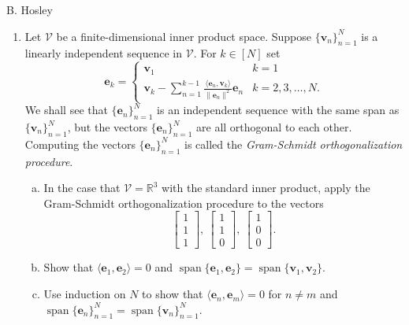 \documentclass[12pt]{amsart}
\newcommand{\1}{\mathbbm{1}}
\numberwithin{equation}{section}
\numberwithin{Theorem}{section}
\theoremstyle{plain} %
\theoremstyle{definition}
\theoremstyle{remark}
\begin{document}
\thispagestyle{empty}

\hspace{\fill} {\Large B. Hosley}
\bigskip \raggedbottom


\begin{enumerate}[1.]

\item Let \(\mathcal{V}\) be a finite-dimensional inner product space. Suppose \(\{\mathbf{v}_{n}\}_{n=1}^{N}\) is a linearly independent sequence in \(\mathcal{V}\).
For \(k\in[N]\) set
\[\mathbf{e}_{k} = \begin{cases} \mathbf{v}_{1} & k=1\\ \displaystyle{\mathbf{v}_{k} - \sum_{n=1}^{k-1}\frac{\langle \mathbf{e}_{n},\mathbf{v}_{k}\rangle}{\|\mathbf{e}_{n}\|^{2}} \mathbf{e}_{n}} & k=2,3,\ldots,N.\end{cases}\]
We shall see that \(\{\mathbf{e}_{n}\}_{n=1}^{N}\) is an independent sequence with the same span as \(\{\mathbf{v}_{n}\}_{n=1}^{N}\), but the vectors \(\{\mathbf{e}_{n}\}_{n=1}^{N}\) are all orthogonal to each other. Computing the vectors \(\{\mathbf{e}_{n}\}_{n=1}^{N}\) is called the \textit{Gram-Schmidt orthogonalization procedure}.\bigskip

\begin{enumerate}[(a)]

\item In the case that \(\mathcal{V} = \mathbb{R}^{3}\) with the standard inner product, apply the Gram-Schmidt orthogonalization procedure to the vectors 
\[\begin{bmatrix} 1\\1\\1\end{bmatrix},\ \begin{bmatrix} 1\\1\\0\end{bmatrix},\ \begin{bmatrix} 1\\0\\0\end{bmatrix}.\]
\bigskip

\item Show that \(\langle \mathbf{e}_{1},\mathbf{e}_{2}\rangle = 0\) and \(\operatorname{span}\{\mathbf{e}_{1},\mathbf{e}_{2}\} = \operatorname{span}\{\mathbf{v}_{1},\mathbf{v}_{2}\}\).\bigskip

\item Use induction on \(N\) to show that \(\langle \mathbf{e}_{n},\mathbf{e}_{m}\rangle = 0\) for \(n\neq m\) and \(\operatorname{span} \{\mathbf{e}_{n}\}_{n=1}^{N} = \operatorname{span}\{\mathbf{v}_{n}\}_{n=1}^{N}\).\bigskip


\end{enumerate}
\end{enumerate}
\end{document}
